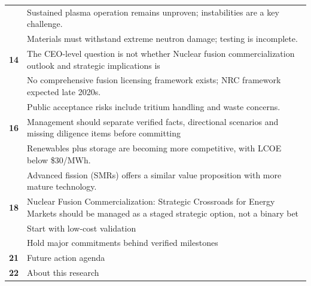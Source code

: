 \documentclass[10pt,a4paper]{article}
\begin{document}
\begin{tabularx}{\linewidth}{p{14mm}Y}
 & {\scriptsize\color{BOMuted} Sustained plasma operation remains unproven; instabilities are a key challenge.} \\[1pt]
 & {\scriptsize\color{BOMuted} Materials must withstand extreme neutron damage; testing is incomplete.} \\[1pt]
\textcolor{BOGreen}{\bfseries 14} & The CEO-level question is not whether Nuclear fusion commercialization outlook and strategic implications is \\[5pt]
 & {\scriptsize\color{BOMuted} No comprehensive fusion licensing framework exists; NRC framework expected late 2020s.} \\[1pt]
 & {\scriptsize\color{BOMuted} Public acceptance risks include tritium handling and waste concerns.} \\[1pt]
\textcolor{BOGreen}{\bfseries 16} & Management should separate verified facts, directional scenarios and missing diligence items before committing \\[5pt]
 & {\scriptsize\color{BOMuted} Renewables plus storage are becoming more competitive, with LCOE below \$30/MWh.} \\[1pt]
 & {\scriptsize\color{BOMuted} Advanced fission (SMRs) offers a similar value proposition with more mature technology.} \\[1pt]
\textcolor{BOGreen}{\bfseries 18} & Nuclear Fusion Commercialization: Strategic Crossroads for Energy Markets should be managed as a staged strategic option, not a binary bet \\[5pt]
 & {\scriptsize\color{BOMuted} Start with low-cost validation} \\[1pt]
 & {\scriptsize\color{BOMuted} Hold major commitments behind verified milestones} \\[1pt]
\textcolor{BOGreen}{\bfseries 21} & Future action agenda \\[5pt]
\textcolor{BOGreen}{\bfseries 22} & About this research \\[5pt]
\end{tabularx}
\clearpage
\end{document}
